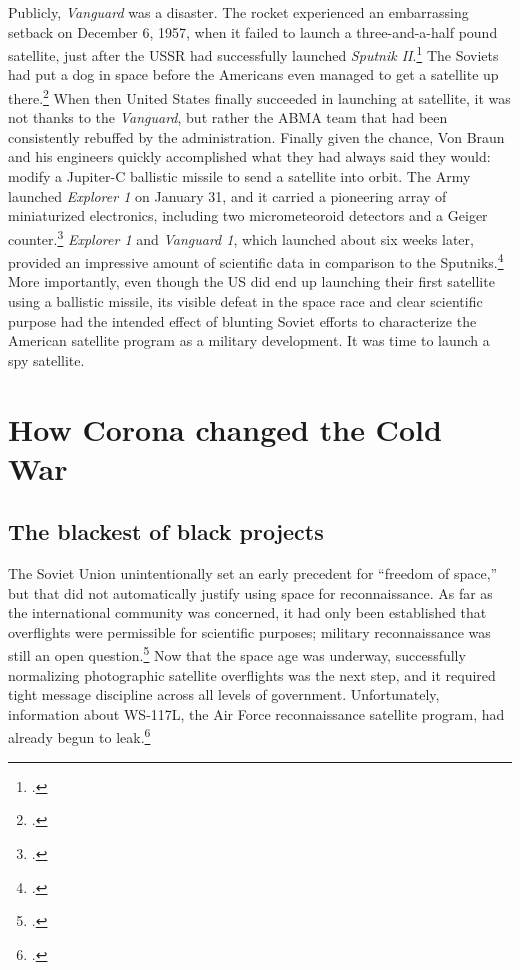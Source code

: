 \documentclass{memoir}
\begin{document}
Publicly, \emph{Vanguard} was a disaster. The rocket experienced an embarrassing setback on December 6, 1957, when it failed to launch a three-and-a-half pound satellite, just after the USSR had successfully launched \emph{Sputnik II}.\footcite[p.~119]{killian_sputnik_1977} The Soviets had put a dog in space before the Americans even managed to get a satellite up there.\footcite[Her name was Laika.]{george_sad_2018} When then United States finally succeeded in launching at satellite, it was not thanks to the \emph{Vanguard}, but rather the ABMA team that had been consistently rebuffed by the administration. Finally given the chance, Von Braun and his engineers quickly accomplished what they had always said they would: modify a Jupiter-C ballistic missile to send a satellite into orbit. The Army launched \emph{Explorer 1} on January 31, and it carried a pioneering array of miniaturized electronics, including two micrometeoroid detectors and a Geiger counter.\footcite[p.~168]{mcdougall_heavens_1985} \emph{Explorer 1} and \emph{Vanguard 1}, which launched about six weeks later, provided an impressive amount of scientific data in comparison to the Sputniks.\footcite[p.~168]{mcdougall_heavens_1985} More importantly, even though the US did end up launching their first satellite using a ballistic missile, its visible defeat in the space race and clear scientific purpose had the intended effect of blunting Soviet efforts to characterize the American satellite program as a military development. It was time to launch a spy satellite.

\section{How Corona changed the Cold War}
\subsection{The blackest of black projects}
The Soviet Union unintentionally set an early precedent for ``freedom of space,'' but that did not automatically justify using space for reconnaissance. As far as the international community was concerned, it had only been established that overflights were permissible for scientific purposes; military reconnaissance was still an open question.\footcite[p.~47-48]{peebles_corona_1997} Now that the space age was underway, successfully normalizing photographic satellite overflights was the next step, and it required tight message discipline across all levels of government. Unfortunately, information about WS-117L, the Air Force reconnaissance satellite program, had already begun to leak.\footcite[p.~96]{lindgren_trust_2000}
\end{document}
